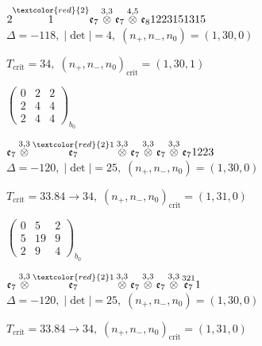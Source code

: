 \documentclass[10pt]{article}
\begin{document}
\smallskip

$2\overset{\textcolor{red}{2}}{1}\mathfrak{e}_7\overset{3,3}{\otimes}\mathfrak{e}_7\overset{4,5}{\otimes}\mathfrak{e}_81223151315$ \quad $\Delta=-118,\; |\det|=4,\; (n_+,n_-,n_0)=(1,30,0)$

\hspace{1em}$T_{\text{crit}}=34,\; (n_+,n_-,n_0)_{\text{crit}}=(1,30,1)$

\hspace{2em}$\left(\begin{smallmatrix}0 & 2 & 2 \\ 2 & 4 & 4 \\ 2 & 4 & 4\end{smallmatrix}\right)_{\!b_0}$

\smallskip

$\mathfrak{e}_7\overset{3,3}{\otimes}\overset{\textcolor{red}{2}1}{\mathfrak{e}_7}\overset{3,3}{\otimes}\mathfrak{e}_7\overset{3,3}{\otimes}\mathfrak{e}_7\overset{3,3}{\otimes}\mathfrak{e}_71223$ \quad $\Delta=-120,\; |\det|=25,\; (n_+,n_-,n_0)=(1,30,0)$

\hspace{1em}$T_{\text{crit}}=33.84 \to 34,\; (n_+,n_-,n_0)_{\text{crit}}=(1,31,0)$

\hspace{2em}$\left(\begin{smallmatrix}0 & 5 & 2 \\ 5 & 19 & 9 \\ 2 & 9 & 4\end{smallmatrix}\right)_{\!b_0}$

\smallskip

$\mathfrak{e}_7\overset{3,3}{\otimes}\overset{\textcolor{red}{2}1}{\mathfrak{e}_7}\overset{3,3}{\otimes}\mathfrak{e}_7\overset{3,3}{\otimes}\mathfrak{e}_7\overset{3,3}{\otimes}\overset{321}{\mathfrak{e}_7}1$ \quad $\Delta=-120,\; |\det|=25,\; (n_+,n_-,n_0)=(1,30,0)$

\hspace{1em}$T_{\text{crit}}=33.84 \to 34,\; (n_+,n_-,n_0)_{\text{crit}}=(1,31,0)$
\end{document}
